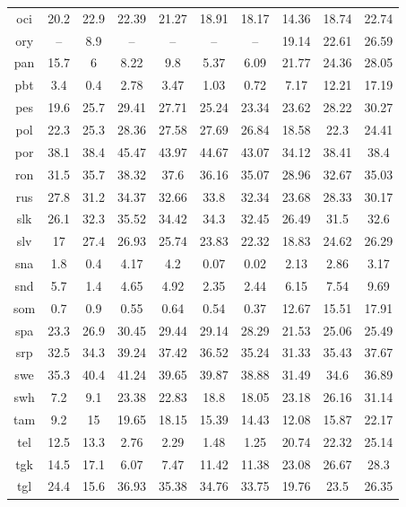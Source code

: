\begin{table}[htb]
\begin{tabular}{@{}cccccccccc@{}}
        oci & 20.2 & 22.9 & 22.39 & 21.27 & 18.91 & 18.17 & 14.36 & 18.74 & 22.74 \\
        ory & -- & 8.9 & -- & -- & -- & -- & 19.14 & 22.61 & 26.59 \\
        pan & 15.7 & 6 & 8.22 & 9.8 & 5.37 & 6.09 & 21.77 & 24.36 & 28.05 \\
        pbt & 3.4 & 0.4 & 2.78 & 3.47 & 1.03 & 0.72 & 7.17 & 12.21 & 17.19 \\
        pes & 19.6 & 25.7 & 29.41 & 27.71 & 25.24 & 23.34 & 23.62 & 28.22 & 30.27 \\
        pol & 22.3 & 25.3 & 28.36 & 27.58 & 27.69 & 26.84 & 18.58 & 22.3 & 24.41 \\
        por & 38.1 & 38.4 & 45.47 & 43.97 & 44.67 & 43.07 & 34.12 & 38.41 & 38.4 \\
        ron & 31.5 & 35.7 & 38.32 & 37.6 & 36.16 & 35.07 & 28.96 & 32.67 & 35.03 \\
        rus & 27.8 & 31.2 & 34.37 & 32.66 & 33.8 & 32.34 & 23.68 & 28.33 & 30.17 \\
        slk & 26.1 & 32.3 & 35.52 & 34.42 & 34.3 & 32.45 & 26.49 & 31.5 & 32.6 \\
        slv & 17 & 27.4 & 26.93 & 25.74 & 23.83 & 22.32 & 18.83 & 24.62 & 26.29 \\
        sna & 1.8 & 0.4 & 4.17 & 4.2 & 0.07 & 0.02 & 2.13 & 2.86 & 3.17 \\
        snd & 5.7 & 1.4 & 4.65 & 4.92 & 2.35 & 2.44 & 6.15 & 7.54 & 9.69 \\
        som & 0.7 & 0.9 & 0.55 & 0.64 & 0.54 & 0.37 & 12.67 & 15.51 & 17.91 \\
        spa & 23.3 & 26.9 & 30.45 & 29.44 & 29.14 & 28.29 & 21.53 & 25.06 & 25.49 \\
        srp & 32.5 & 34.3 & 39.24 & 37.42 & 36.52 & 35.24 & 31.33 & 35.43 & 37.67 \\
        swe & 35.3 & 40.4 & 41.24 & 39.65 & 39.87 & 38.88 & 31.49 & 34.6 & 36.89 \\
        swh & 7.2 & 9.1 & 23.38 & 22.83 & 18.8 & 18.05 & 23.18 & 26.16 & 31.14 \\
        tam & 9.2 & 15 & 19.65 & 18.15 & 15.39 & 14.43 & 12.08 & 15.87 & 22.17 \\
        tel & 12.5 & 13.3 & 2.76 & 2.29 & 1.48 & 1.25 & 20.74 & 22.32 & 25.14 \\
        tgk & 14.5 & 17.1 & 6.07 & 7.47 & 11.42 & 11.38 & 23.08 & 26.67 & 28.3 \\
        tgl & 24.4 & 15.6 & 36.93 & 35.38 & 34.76 & 33.75 & 19.76 & 23.5 & 26.35 \\

\end{tabular}
\end{table}
